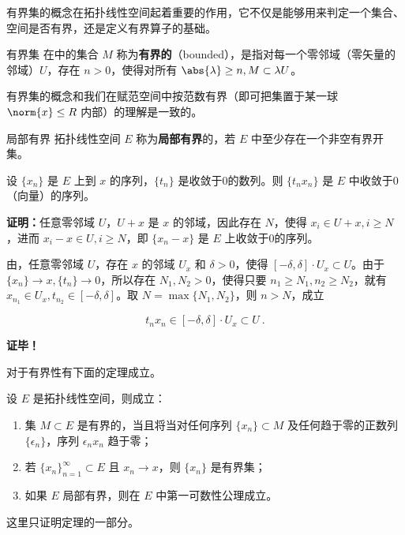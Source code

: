 
有界集的概念在拓扑线性空间起着重要的作用，它不仅是能够用来判定一个集合、空间是否有界，还是定义有界算子的基础。

\begin{definition}{有界集}\label{def_BudSet_1}
在中的集合 $M$ 称为\textbf{有界的}（bounded），是指对每一个零邻域（零矢量的邻域）$U$，存在 $n>0$，使得对所有 $\abs{\lambda}\geq n,M\subset \lambda U$。 
\end{definition}
有界集的概念和我们在赋范空间中按范数有界（即可把集置于某一球 $\norm{x}\leq R$ 内部）的理解是一致的。

\begin{definition}{局部有界}
拓扑线性空间 $E$ 称为\textbf{局部有界}的，若 $E$ 中至少存在一个非空有界开集。
\end{definition}

\begin{lemma}{}
设 $\{x_n\}$ 是 $E$ 上到 $x$ 的序列，$\{t_n\}$ 是收敛于0的数列。则 $\{t_nx_n\}$ 是 $E$ 中收敛于0（向量）的序列。
\end{lemma}

\textbf{证明：}任意零邻域 $U$，$U+x$ 是 $x$ 的邻域，因此存在 $N$，使得 $x_i\in U+x,i\geq N$，进而 $x_i-x\in U,i\geq N$，即 $\{x_n-x\}$ 是 $E$ 上收敛于0的序列。

由，任意零邻域 $U$，存在 $x$ 的邻域 $U_x$ 和 $\delta>0$，使得 $[-\delta,\delta]\cdot U_x\subset U$。由于 $\{x_n\}\rightarrow x,\{t_n\}\rightarrow0$，所以存在 $N_1,N_2>0$，使得只要 $n_1\geq N_1,n_2\geq N_2$，就有 $x_{n_1}\in U_x,t_{n_2}\in[-\delta,\delta]$。取 $N=\max\{N_1,N_2\}$，则 $n>N$，成立

\begin{equation}
t_nx_n\in[-\delta,\delta]\cdot U_x\subset U~.
\end{equation}


\textbf{证毕！}


对于有界性有下面的定理成立。
\begin{theorem}{}\label{the_BudSet_1}
设 $E$ 是拓扑线性空间，则成立：
\begin{enumerate}
\item 集 $M\subset E$ 是有界的，当且将当对任何序列 $\{x_n\}\subset M$ 及任何趋于零的正数列 $\{\epsilon_n\}$，序列 $\epsilon_n x_n$ 趋于零；
\item 若 $\{x_n\}_{n=1}^\infty\subset E$ 且 $x_n\rightarrow x$，则 $\{x_n\}$ 是有界集；
\item 如果 $E$ 局部有界，则在 $E$ 中第一可数性公理成立。 
\end{enumerate}

\end{theorem}
这里只证明定理的一部分。

